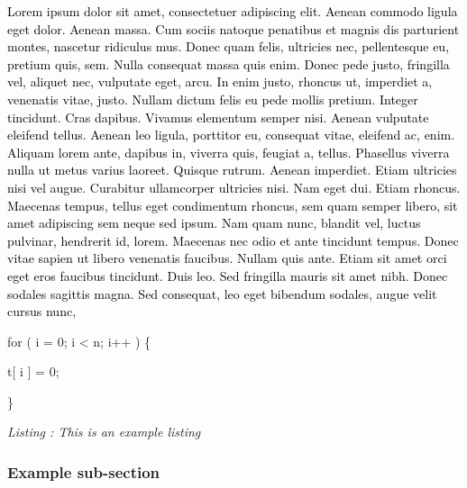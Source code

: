 \documentclass[a4paper]{article}
\makeatletter
\newcommand\captionof[1]{\def\@captype{#1}\caption}
\newcounter{Listing}
\renewcommand\theListing{\arabic{Listing}}
\makeatother
\begin{document}
\captionof{figure}[This is an example figure caption]{\hypertarget{Toc98342041}{}This is an example figure caption}

\bigskip


\bigskip

\textcolor{black}{Lorem ipsum dolor sit amet, consectetuer adipiscing elit. Aenean commodo ligula eget dolor. Aenean
massa. Cum sociis natoque penatibus et magnis dis parturient montes, nascetur ridiculus mus. Donec quam felis,
ultricies nec, pellentesque eu, pretium quis, sem. Nulla consequat massa quis enim. Donec pede justo, fringilla vel,
aliquet nec, vulputate eget, arcu. In enim justo, rhoncus ut, imperdiet a, venenatis vitae, justo. Nullam dictum felis
eu pede mollis pretium. Integer tincidunt. Cras dapibus. Vivamus elementum semper nisi. Aenean vulputate eleifend
tellus. Aenean leo ligula, porttitor eu, consequat vitae, eleifend ac, enim. Aliquam lorem ante, dapibus in, viverra
quis, feugiat a, tellus. Phasellus viverra nulla ut metus varius laoreet. Quisque rutrum. Aenean imperdiet. Etiam
ultricies nisi vel augue. Curabitur ullamcorper ultricies nisi. Nam eget dui. Etiam rhoncus. Maecenas tempus, tellus
eget condimentum rhoncus, sem quam semper libero, sit amet adipiscing sem neque sed ipsum. Nam quam nunc, blandit vel,
luctus pulvinar, hendrerit id, lorem. Maecenas nec odio et ante tincidunt tempus. Donec vitae sapien ut libero
venenatis faucibus. Nullam quis ante. Etiam sit amet orci eget eros faucibus tincidunt. Duis leo. Sed fringilla mauris
sit amet nibh. Donec sodales sagittis magna. Sed consequat, leo eget bibendum sodales, augue velit cursus nunc,}


\bigskip

for ( i = 0; i {\textless} n; i++ ) \{ 

t[ i ] = 0; 

\} 

{\itshape\color[rgb]{0.26666668,0.32941177,0.41568628}
Listing \stepcounter{Listing}{\theListing}: This is an example listing}


\bigskip


\bigskip

\subsubsection{Example sub-section}
\hypertarget{Toc98342036}{}
\bigskip
\end{document}
